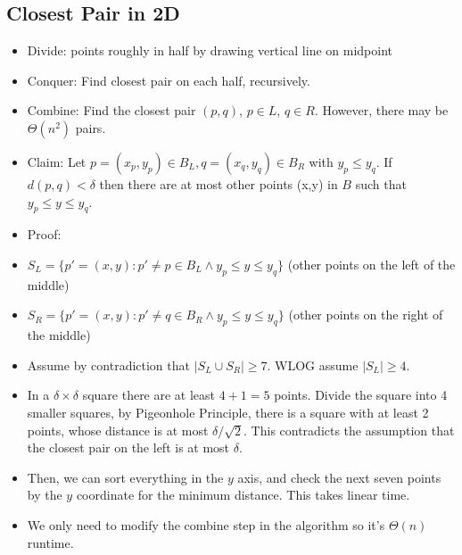 \documentclass[a4paper,12pt]{article}
\begin{document}
\subsection{Closest Pair in 2D}
\begin{itemize}
    \item Divide: points roughly in half by drawing vertical line on midpoint
    \item Conquer: Find closest pair on each half, recursively.
    \item Combine: Find the closest pair $(p,q)$, $p\in L$, $q\in R$. However, there may be $\Theta(n^2)$ pairs.
\end{itemize}
\begin{itemize}
    \item Claim: Let $p=(x_p,y_p)\in B_L,q=(x_q,y_q)\in B_R$ with $y_p\leq y_q$. If $d(p,q)<\delta$ then there are at most  other points (x,y) in $B$ such that $y_p\leq y\leq y_q$.
    \item Proof:
    \item $S_L=\{p'=(x,y):p'\neq p\in B_L\land y_p\leq y\leq y_q\}$ (other points on the left of the middle)
    \item $S_R=\{p'=(x,y):p'\neq q\in B_R\land y_p\leq y\leq y_q\}$ (other points on the right of the middle)
    \item Assume by contradiction that $|S_L\cup S_R|\geq 7$. WLOG assume $|S_L|\geq 4$.
    \item In a $\delta\times\delta$ square there are at least $4+1=5$ points. Divide the square into 4 smaller squares, by Pigeonhole Principle, there is a square with at least 2 points, whose distance is at most $\delta/\sqrt2$. This contradicts the assumption that the closest pair on the left is at most $\delta$.
\end{itemize}
\begin{itemize}
    \item Then, we can sort everything in the $y$ axis, and check the next seven points by the $y$ coordinate for the minimum distance. This takes linear time.
    \item We only need to modify the combine step in the algorithm so it's $\Theta(n)$ runtime.
\end{itemize}
\end{document}
